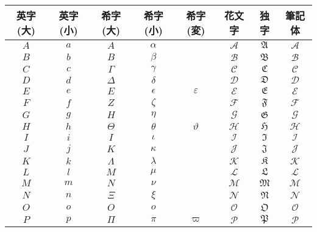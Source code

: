 
	\begin{table}[htb]
		\begin{tabular}{|c|c|c|c|c|c|c|c|} \hline
			英字(大) & 英字(小) & 希字(大) & 希字(小) & 希字(変) & 花文字 & 独字 & 筆記体 \\ \hline \hline
			$A$ & $a$ & $A$        & $\alpha$   &               & $\mathscr{A}$ & $\mathfrak{A}$ & $\mathcal{A}$ \\ \hline
			$B$ & $b$ & $B$        & $\beta$    &               & $\mathscr{B}$ & $\mathfrak{B}$ & $\mathcal{B}$ \\ \hline
			$C$ & $c$ & $\Gamma$   & $\gamma$   &               & $\mathscr{C}$ & $\mathfrak{C}$ & $\mathcal{C}$ \\ \hline
			$D$ & $d$ & $\Delta$   & $\delta$   &               & $\mathscr{D}$ & $\mathfrak{D}$ & $\mathcal{D}$ \\ \hline
			$E$ & $e$ & $E$        & $\epsilon$ & $\varepsilon$ & $\mathscr{E}$ & $\mathfrak{E}$ & $\mathcal{E}$ \\ \hline
			$F$ & $f$ & $Z$        & $\zeta$    &               & $\mathscr{F}$ & $\mathfrak{F}$ & $\mathcal{F}$ \\ \hline
			$G$ & $g$ & $H$        & $\eta$     &               & $\mathscr{G}$ & $\mathfrak{G}$ & $\mathcal{G}$ \\ \hline
			$H$ & $h$ & $\Theta$   & $\theta$   & $\vartheta$   & $\mathscr{H}$ & $\mathfrak{H}$ & $\mathcal{H}$ \\ \hline
			$I$ & $i$ & $I$        & $\iota$    &               & $\mathscr{I}$ & $\mathfrak{I}$ & $\mathcal{I}$ \\ \hline
			$J$ & $j$ & $K$        & $\kappa$   &               & $\mathscr{J}$ & $\mathfrak{J}$ & $\mathcal{J}$ \\ \hline
			$K$ & $k$ & $\Lambda$  & $\lambda$  &               & $\mathscr{K}$ & $\mathfrak{K}$ & $\mathcal{K}$ \\ \hline
			$L$ & $l$ & $M$        & $\mu$      &               & $\mathscr{L}$ & $\mathfrak{L}$ & $\mathcal{L}$ \\ \hline
			$M$ & $m$ & $N$        & $\nu$      &               & $\mathscr{M}$ & $\mathfrak{M}$ & $\mathcal{M}$ \\ \hline
			$N$ & $n$ & $\Xi$      & $\xi$      &               & $\mathscr{N}$ & $\mathfrak{N}$ & $\mathcal{N}$ \\ \hline
			$O$ & $o$ & $O$        & $o$        &               & $\mathscr{O}$ & $\mathfrak{O}$ & $\mathcal{O}$ \\ \hline
			$P$ & $p$ & $\Pi$      & $\pi$      & $\varpi$      & $\mathscr{P}$ & $\mathfrak{P}$ & $\mathcal{P}$ \\ \hline

\end{tabular}
\end{table}

